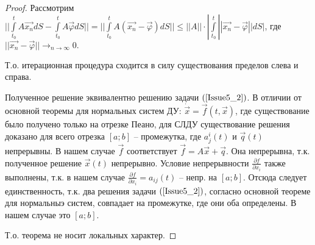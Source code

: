 \begin{proof}
Рассмотрим $|| \int\limits_{t_0}^{t} A\vec{x_n}dS - \int\limits_{t_0}^{t} A\vec{\varphi} dS || = || \int\limits_{t_0}^{t} A(\vec{x_n} - \vec{\varphi})dS || \leqslant ||A||\cdot | \int\limits_{t_0}^{t} ||\vec{x_n} - \vec{\varphi}|| dS | $, где $||\vec{x_n} - \vec{\varphi} || \rightarrow_{n\rightarrow \infty} 0.$

Т.о. итерационная процедура сходится в силу существования пределов слева и справа.

Полученное решение эквивалентно решению задачи $(\ref{Issue5_2})$. В отличии от основной теоремы для нормальных систем ДУ: $\dot{\vec{x}} = \vec{f}(t, \vec{x})$, где существование было получено только на отрезке Пеано, для СЛДУ существование решения доказано для всего отрезка $[a;b]$ -- промежутка, где $a_j^i(t)$ и $\vec{q}(t)$ непрерывны. В нашем случае $\vec{f}$ соответствует $\vec{f} = A\vec{x} + \vec{q}$. Она непрерывна, т.к. полученное решение $\vec{x}(t)$ непрерывно. Условие непрерывности $\frac{\partial f}{\partial x_i}$ также выполнены, т.к. в нашем случае $\frac{\partial f}{\partial x_i} = a_{ij}(t)$ -- непр. на $[a;b]$. Отсюда следует единственность, т.к. два решения задачи $(\ref{Issue5_2})$, согласно основной теореме для нормальныэ систем, совпадает на промежутке, где они оба определены. В нашем случае это $[a;b]$.

Т.о. теорема не носит локальных характер.

\end{proof}




















 
